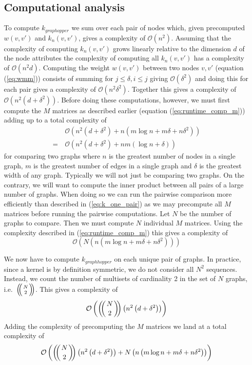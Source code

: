 \documentclass{article}
\def\multiset#1#2{\ensuremath{\left(\kern-.3em\left(\genfrac{}{}{0pt}{}{#1}{#2}\right)\kern-.3em\right)}}
\begin{document}
\subsection{Computational analysis}
\label{sec:computational_analysis}
To compute $k_{graphopper}$ we sum over each pair of nodes which, given precomputed $w(v,v')$ and $k_n(v,v')$, gives a complexity of $\mathcal{O}(n^2)$. Assuming that the complexity of computing $k_n(v,v')$ grows linearly relative to the dimension $d$ of the node attributes the complexity of computing all $k_n(v,v')$ has a complexity of $\mathcal{O}(n^2d)$. Computing the weight $w(v,v')$ between two nodes $v,v'$ (equation (\ref{eq:wmm})) consists of summing for $j\leq \delta,i\leq j$ giving $\mathcal{O}(\delta^2)$ and doing this for each pair gives a complexity of $\mathcal{O}(n^2\delta^2)$. Together this gives a complexity of $\mathcal{O}(n^2(d + \delta^2))$. Before doing these computations, however, we must first compute the $M$ matrices as described earlier (equation (\ref{eq:runtime_comp_m})) adding up to a total complexity of
\begin{align}
&\mathcal{O}\left(n^2\left(d + \delta^2\right) + n\left(m\log n + m\delta + n\delta^2\right)\right)\\
=\ &\mathcal{O}\left(n^2\left(d+\delta^2\right)+nm\left(\log n + \delta\right)\right)
\label{eq:k_one_pair}
\end{align}
for comparing two graphs where $n$ is the greatest number of nodes in a single graph, $m$ is the greatest number of edges in a single graph and $\delta$ is the greatest width of any graph. Typically we will not just be comparing two graphs. On the contrary, we will want to compute the inner product between all pairs of a large number of graphs. When doing so we can run the pairwise comparison more efficiently than described in (\ref{eq:k_one_pair}) as we may precompute all $M$ matrices before running the pairwise computations. Let $N$ be the number of graphs to compare. Then we must compute $N$ individual $M$ matrices. Using the complexity described in (\ref{eq:runtime_comp_m}) this gives a complexity of
\begin{equation}
\mathcal{O}\left(N\left(n\left(m\log n + m\delta + n\delta^2\right)\right)\right)
\end{equation}

We now have to compute $k_{graphhopper}$ on each unique pair of graphs. In practice, since a kernel is by definition symmetric, we do not consider all $N^2$ sequences. Instead, we count the number of multisets of cardinality 2 in the set of $N$ graphs, i.e.\ $\multiset{N}{2}$. This gives a complexity of
\begin{equation}
\mathcal{O}\left(\multiset{N}{2}\left(n^2\left(d+\delta^2\right)\right)\right)
\end{equation}
Adding the complexity of precomputing the $M$ matrices we land at a total complexity of
\begin{equation}
\mathcal{O}\left(\multiset{N}{2}\left(n^2\left(d+\delta^2\right)\right) + N\left(n\left(m\log n + m\delta + n\delta^2\right)\right)\right)
\end{equation}
\end{document}
